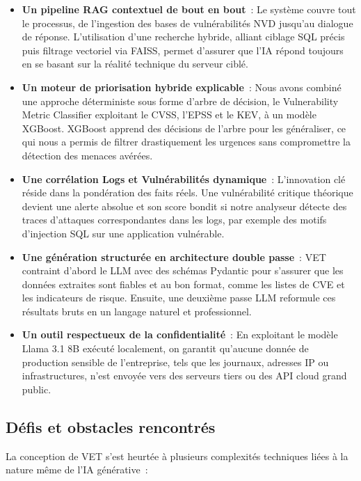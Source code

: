 \documentclass[runningheads]{llncs}
\begin{document}
\begin{itemize}
    \item \textbf{Un pipeline RAG contextuel de bout en bout}~: Le système couvre tout le processus, de l'ingestion des bases de vulnérabilités NVD jusqu'au dialogue de réponse. L'utilisation d'une recherche hybride, alliant ciblage SQL précis puis filtrage vectoriel via FAISS, permet d'assurer que l'IA répond toujours en se basant sur la réalité technique du serveur ciblé.
    \item \textbf{Un moteur de priorisation hybride explicable}~: Nous avons combiné une approche déterministe sous forme d'arbre de décision, le Vulnerability Metric Classifier exploitant le CVSS, l'EPSS et le KEV, à un modèle XGBoost. XGBoost apprend des décisions de l'arbre pour les généraliser, ce qui nous a permis de filtrer drastiquement les urgences sans compromettre la détection des menaces avérées.
    \item \textbf{Une corrélation Logs et Vulnérabilités dynamique}~: L'innovation clé réside dans la pondération des faits réels. Une vulnérabilité critique théorique devient une alerte absolue et son score bondit si notre analyseur détecte des traces d'attaques correspondantes dans les logs, par exemple des motifs d'injection SQL sur une application vulnérable.
    \item \textbf{Une génération structurée en architecture double passe}~: VET contraint d'abord le LLM avec des schémas Pydantic pour s'assurer que les données extraites sont fiables et au bon format, comme les listes de CVE et les indicateurs de risque. Ensuite, une deuxième passe LLM reformule ces résultats bruts en un langage naturel et professionnel.
    \item \textbf{Un outil respectueux de la confidentialité}~: En exploitant le modèle Llama 3.1 8B exécuté localement, on garantit qu'aucune donnée de production sensible de l'entreprise, tels que les journaux, adresses IP ou infrastructures, n'est envoyée vers des serveurs tiers ou des API cloud grand public.
\end{itemize}

\subsection{Défis et obstacles rencontrés}

La conception de VET s'est heurtée à plusieurs complexités techniques liées à la nature même de l'IA générative~:
\end{document}
